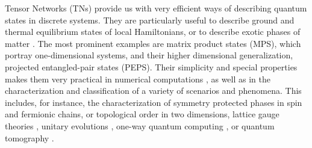 \documentclass[preprint, superscriptaddress,a4paper,longbibliography]{revtex4-1}
\theoremstyle{definition}
\begin{document}
%
%
%


Tensor Networks (TNs) provide us with very efficient ways of describing quantum states in discrete systems. They are particularly useful to describe ground \cite{Hastings2006a} and thermal equilibrium states \cite{Hastings2006a,Molnar2015} of local Hamiltonians, or to describe exotic phases of matter \cite{Affleck1988,Schuch2010}. The most prominent examples are matrix product states \cite{Fannes1992,Kluemper1993} (MPS), which portray one-dimensional systems, and their higher dimensional generalization, projected entangled-pair states \cite{Verstraete2003} (PEPS). Their simplicity and special properties makes them very practical in numerical computations \cite{White1992,Verstraete2008,Orus2013,Vidal2007}, as well as in the characterization and classification of a variety of scenarios and phenomena. This includes, for instance, the characterization of symmetry protected phases in spin \cite{Pollmann2010,Chen2010a,Schuch2011} and fermionic \cite{Fidkowski2011} chains, or topological order \cite{Schuch2010,Levin2005,Sahinoglu2014} in two dimensions, lattice gauge theories \cite{Rico2013,Haegeman2014}, unitary evolutions \cite{Schumacher2004,Cirac2017a}, one-way quantum computing \cite{Raussendorf2001,Verstraete2003,Gross2007}, or quantum tomography \cite{Cramer2011}.
\end{document}
